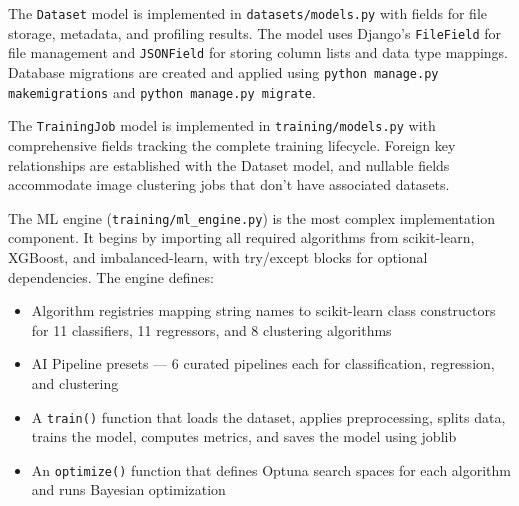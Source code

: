 \documentclass[12pt,a4paper]{report}
\begin{document}
The \texttt{Dataset} model is implemented in \texttt{datasets/models.py} with fields for file storage, metadata, and profiling results. The model uses Django's \texttt{FileField} for file management and \texttt{JSONField} for storing column lists and data type mappings. Database migrations are created and applied using \texttt{python manage.py makemigrations} and \texttt{python manage.py migrate}.

The \texttt{TrainingJob} model is implemented in \texttt{training/models.py} with comprehensive fields tracking the complete training lifecycle. Foreign key relationships are established with the Dataset model, and nullable fields accommodate image clustering jobs that don't have associated datasets.

The ML engine (\texttt{training/ml\_engine.py}) is the most complex implementation component. It begins by importing all required algorithms from scikit-learn, XGBoost, and imbalanced-learn, with try/except blocks for optional dependencies. The engine defines:
\begin{itemize}
    \item Algorithm registries mapping string names to scikit-learn class constructors for 11 classifiers, 11 regressors, and 8 clustering algorithms
    \item AI Pipeline presets — 6 curated pipelines each for classification, regression, and clustering
    \item A \texttt{train()} function that loads the dataset, applies preprocessing, splits data, trains the model, computes metrics, and saves the model using joblib
    \item An \texttt{optimize()} function that defines Optuna search spaces for each algorithm and runs Bayesian optimization
\end{itemize}
\end{document}
